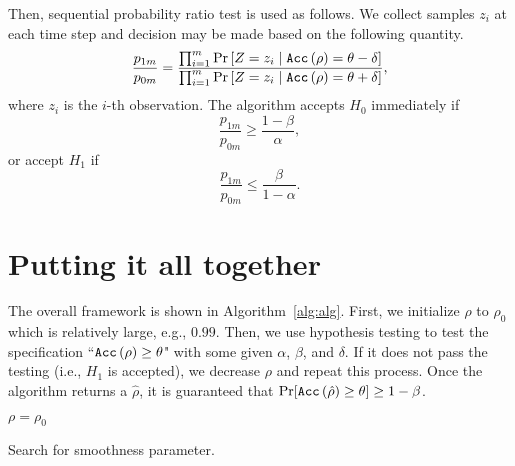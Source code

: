 \documentclass[12pt]{article}
\begin{document}
Then, sequential probability ratio test is used as follows. We collect samples $z_i$ at each time step and decision may be made based on the following quantity.
$$\frac{p_{1 m}}{p_{0 m}}=\frac{\prod_{i=1}^{m} \operatorname{Pr}\left[Z=z_{i} \mid \texttt{Acc}\left(\rho\right) = \theta-\delta\right]}{\prod_{i=1}^{m} \operatorname{Pr}\left[Z=z_{i} \mid \texttt{Acc}\left(\rho\right) = \theta+\delta\right]},$$
where $z_i$ is the $i$-th observation. The algorithm accepts $H_0$ immediately if
$$
\frac{p_{1 m}}{p_{0 m}} \geq \frac{1-\beta}{\alpha},
$$
or accept $H_{1}$ if
$$
\frac{p_{1 m}}{p_{0 m}} \leq \frac{\beta}{1-\alpha}.
$$

\section{Putting it all together}
\label{sec:overall}
The overall framework is shown in Algorithm~\ref{alg:alg}. First, we initialize $\rho$ to $\rho_0$ which is relatively large, e.g., $0.99$. Then, we use hypothesis testing to test the specification ``$\texttt{Acc}\left(\rho\right) \geq \theta$" with some given $\alpha$, $\beta$, and $\delta$. If it does not pass the testing (i.e., $H_1$ is accepted), we decrease $\rho$ and repeat this process. Once the algorithm returns a $\hat{\rho}$, it is guaranteed that $\Pr[\texttt{Acc}\left(\hat{\rho}\right) \geq \theta] \geq 1-\beta$.

\begin{algorithm}[tbph]
$\rho = \rho_0$\;
\caption{Search for smoothness parameter.}
\label{alg:alg}
\end{algorithm}
\end{document}
